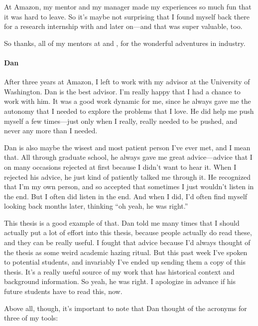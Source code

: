 At Amazon, my mentor  and my manager  made my experiences so much fun
that it was hard to leave. So it's maybe not surprising that I found myself back there for a research internship with
 and  later on---and that was super valuable, too.

So thanks, all of my mentors at  and , for
the wonderful adventures in industry. %

\paragraph{Dan}
After three years at Amazon, I left to work with my advisor  at the University of Washington.
Dan is the best advisor.
I'm really happy that I had a chance to work with him.
It was a good work dynamic for me, since he always gave me the autonomy that I needed to explore the problems that I love.
He did help me push myself a few times---just only when I really, really needed to be pushed,
and never any more than I needed.

Dan is also maybe the wisest and most patient person I've ever met, and I mean that.
All through graduate school, he always gave me great advice---advice that I on many occasions rejected at first because I didn't want to hear it.
When I rejected his advice, he just kind of patiently talked me through it.
He recognized that I'm my own person, and so accepted that sometimes I just wouldn't listen in the end.
But I often did listen in the end.
And when I did, I'd often find myself looking back months later, thinking ``oh yeah, he was right.''

This thesis is a good example of that.
Dan told me many times that I should actually put a lot of effort into this thesis, because people actually do read these,
and they can be really useful.
I fought that advice because I'd always thought of the thesis as some weird academic hazing ritual.
But this past week I've spoken to potential students, and invariably I've ended up sending them a copy of this thesis.
It's a really useful source of my work that has historical context and background information.
So yeah, he was right. I apologize in advance if his future students have to read this, now.

Above all, though, it's important to note that Dan thought of the acronyms for three of my tools:

